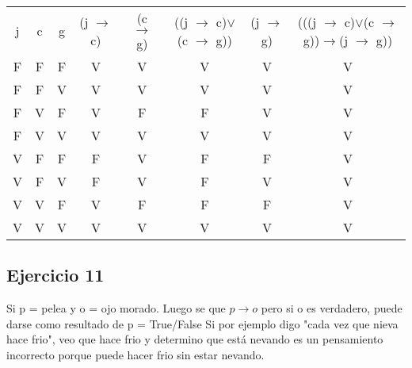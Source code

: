 \begin{tabular}{c|c|c|c|c|c|c|c}
    j & c & g & (j $\rightarrow$ c) & (c $\rightarrow$ g) & ((j $\rightarrow$ c)$\vee$(c $\rightarrow$ g)) & (j $\rightarrow$ g) & (((j $\rightarrow$ c)$\vee$(c $\rightarrow$ g))$\rightarrow$(j $\rightarrow$ g)) \\
    F          & F          & F          & V              & V              & V                          & V              & V                                      \\
    F          & F          & V          & V              & V              & V                          & V              & V                                      \\
    F          & V          & F          & V              & F              & F                          & V              & V                                      \\
    F          & V          & V          & V              & V              & V                          & V              & V                                      \\
    V          & F          & F          & F              & V              & F                          & F              & V                                      \\
    V          & F          & V          & F              & V              & F                          & V              & V                                      \\
    V          & V          & F          & V              & F              & F                          & F              & V                                      \\
    V          & V          & V          & V              & V              & V                          & V              & V                                     
\end{tabular}

\subsection{Ejercicio 11}
Si p = pelea y o = ojo morado. Luego se que $p \rightarrow o$ pero si o es verdadero, puede darse como resultado de p = True/False
Si por ejemplo digo "cada vez que nieva hace frio", veo que hace frio y determino que está nevando es un pensamiento incorrecto
porque puede hacer frio sin estar nevando.



